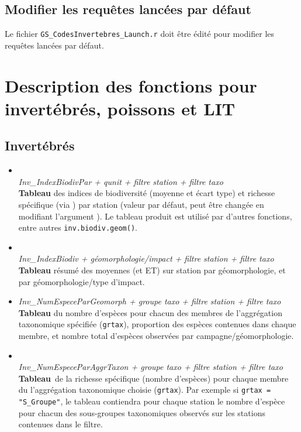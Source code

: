 \documentclass{article}
\begin{document}
\subsection*{Modifier les requêtes lancées par défaut}
Le fichier \texttt{GS\_CodesInvertebres\_Launch.r} doit être édité
pour modifier les requêtes lancées par défaut.


\section{Description des fonctions pour invertébrés, poissons et LIT}
\subsection{Invertébrés}

\begin{itemize}
  \item[]  \\
    \emph{Inv\_IndexBiodivPar + qunit + filtre station + filtre taxo} \\
  \textbf{Tableau} des indices de biodiversité (moyenne et écart type)
  et richesse spécifique (via ) par station (valeur par défaut, peut être
  changée en modifiant l'argument ). Le tableau produit
  est utilisé par d'autres fonctions, entre autres \texttt{inv.biodiv.geom()}.

  \item[] \\
    \emph{Inv\_IndexBiodiv + géomorphologie/impact + filtre station + filtre taxo}\\
    \textbf{Tableau} résumé des moyennes (et ET) sur station par
    géomorphologie, et par géomorphologie/type d'impact.

  \item[] 
    \emph{Inv\_NumEspeceParGeomorph + groupe taxo + filtre station +
      filtre taxo} \\
    \textbf{Tableau} du nombre d'espèces pour chacun des membres de
    l'aggrégation taxonomique spécifiée (\texttt{grtax}), proportion
    des espèces contenues dans chaque membre, et nombre total
    d'espèces observées par campagne/géomorphologie.

  \item[] \\
    \emph{Inv\_NumEspeceParAggrTaxon + groupe taxo + filtre station +
      filtre taxo} \\
    \textbf{Tableau} de la richesse spécifique (nombre d'espèces) pour
    chaque membre du l'aggrégation taxonomique choisie
    (\texttt{grtax}). Par exemple si \texttt{grtax = "S_Groupe"}, le
    tableau contiendra pour chaque station le nombre d'espèce pour
    chacun des sous-groupes taxonomiques observés sur les stations
    contenues dans le filtre.


\end{itemize}
\end{document}
